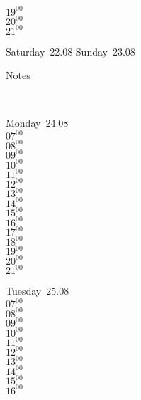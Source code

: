 \documentclass[11pt,a4paper]{book}\usepackage[]{graphicx}\usepackage[]{color}
\begin{document}
{{{{{{{\begin{tcolorbox}
{$19^{00}$\\
$20^{00}$\\
$21^{00}$}\\
\end{tcolorbox} 
%
\begin{tcolorbox}[height=(\textheight-10mm)/6]
Saturday~22.08
\tcblower
Sunday~23.08
\end{tcolorbox} %
%
\begin{tcolorbox}[height=(\textheight-10mm)/6,sidebyside=false]
Notes
\end{tcolorbox}
\clearpage
\vspace{2 mm}\\
%
%
\begin{tcolorbox}
Monday~24.08\\
{ 
$07^{00}$\\
$08^{00}$\\
$09^{00}$\\
$10^{00}$\\
$11^{00}$\\
$12^{00}$\\
$13^{00}$\\
$14^{00}$\\
$15^{00}$\\
$16^{00}$\\
$17^{00}$\\
$18^{00}$\\
$19^{00}$\\
$20^{00}$\\
$21^{00}$}\\
\end{tcolorbox}
%
\begin{tcolorbox}
Tuesday~25.08\\
{ 
$07^{00}$\\
$08^{00}$\\
$09^{00}$\\
$10^{00}$\\
$11^{00}$\\
$12^{00}$\\
$13^{00}$\\
$14^{00}$\\
$15^{00}$\\
$16^{00}$\\
}
\end{tcolorbox}}}}}}}}
\end{document}
